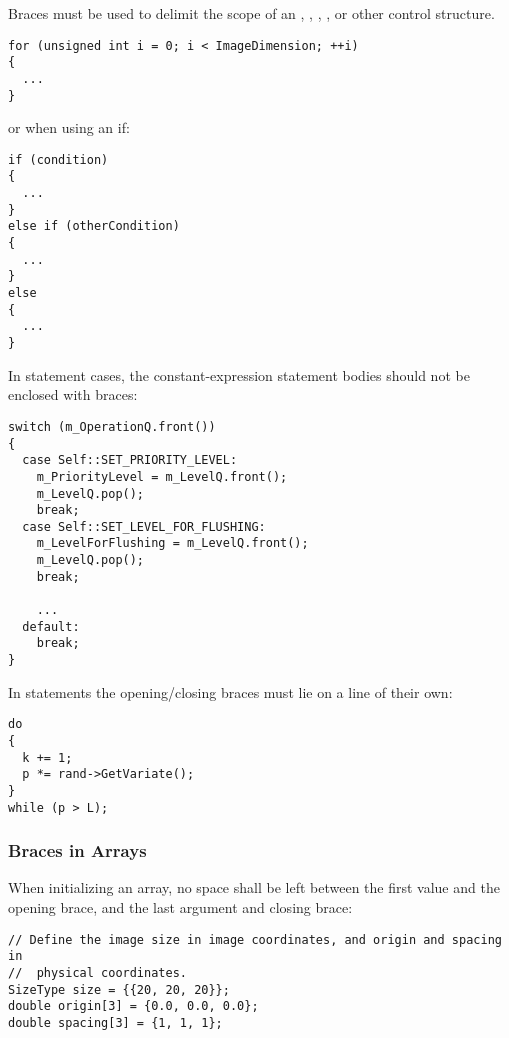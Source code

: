 Braces must be used to delimit the scope of an , ,
, , or other control structure.

\small
\begin{verbatim}
for (unsigned int i = 0; i < ImageDimension; ++i)
{
  ...
}
\end{verbatim}
\normalsize

or when using an if:

\small

\begin{verbatim}
if (condition)
{
  ...
}
else if (otherCondition)
{
  ...
}
else
{
  ...
}
\end{verbatim}
\normalsize

In  statement cases, the constant-expression statement bodies should
not be enclosed with braces:

\small
\begin{verbatim}
switch (m_OperationQ.front())
{
  case Self::SET_PRIORITY_LEVEL:
    m_PriorityLevel = m_LevelQ.front();
    m_LevelQ.pop();
    break;
  case Self::SET_LEVEL_FOR_FLUSHING:
    m_LevelForFlushing = m_LevelQ.front();
    m_LevelQ.pop();
    break;

    ...
  default:
    break;
}
\end{verbatim}
\normalsize

In  statements the opening/closing braces must lie on a line of
their own:

\small
\begin{verbatim}
do
{
  k += 1;
  p *= rand->GetVariate();
}
while (p > L);
\end{verbatim}
\normalsize

\subsubsection{Braces in Arrays}
\label{subsubsec:BracesInArrays}

When initializing an array, no space shall be left between the first value and
the opening brace, and the last argument and closing brace:

\small
\begin{verbatim}
// Define the image size in image coordinates, and origin and spacing in
//  physical coordinates.
SizeType size = {{20, 20, 20}};
double origin[3] = {0.0, 0.0, 0.0};
double spacing[3] = {1, 1, 1};
\end{verbatim}
\normalsize


